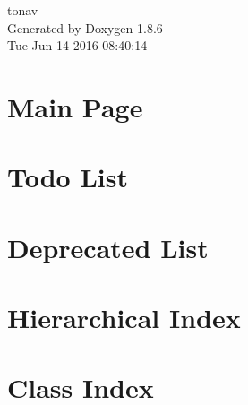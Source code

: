 \documentclass[twoside]{book}
\newcommand{\clearemptydoublepage}{%
  \newpage{\pagestyle{empty}\cleardoublepage}%
}
\begin{document}
\hypersetup{pageanchor=false}
\begin{titlepage}
\vspace*{7cm}
\begin{center}%
{\Large tonav }\\
\vspace*{1cm}
{\large Generated by Doxygen 1.8.6}\\
\vspace*{0.5cm}
{\small Tue Jun 14 2016 08:40:14}\\
\end{center}
\end{titlepage}
\clearemptydoublepage
\tableofcontents
\clearemptydoublepage
{}
\hypersetup{pageanchor=true}

\chapter{Main Page}
\label{index}\hypertarget{index}{}
\chapter{Todo List}
\label{todo}
\hypertarget{todo}{}

\chapter{Deprecated List}
\label{deprecated}
\hypertarget{deprecated}{}

\chapter{Hierarchical Index}

\chapter{Class Index}

\end{document}
